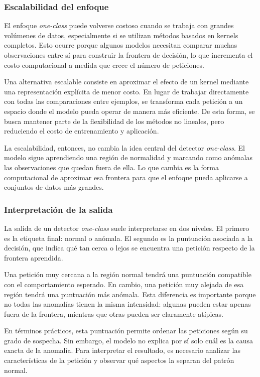 \documentclass[12pt,oneside]{report}
\begin{document}
\subsubsection{Escalabilidad del enfoque}

El enfoque \textit{one-class} puede volverse costoso cuando se trabaja con grandes volúmenes de datos, especialmente si se utilizan métodos basados en kernels completos. Esto ocurre porque algunos modelos necesitan comparar muchas observaciones entre sí para construir la frontera de decisión, lo que incrementa el costo computacional a medida que crece el número de peticiones.

Una alternativa escalable consiste en aproximar el efecto de un kernel mediante una representación explícita de menor costo. En lugar de trabajar directamente con todas las comparaciones entre ejemplos, se transforma cada petición a un espacio donde el modelo pueda operar de manera más eficiente. De esta forma, se busca mantener parte de la flexibilidad de los métodos no lineales, pero reduciendo el costo de entrenamiento y aplicación.

La escalabilidad, entonces, no cambia la idea central del detector \textit{one-class}. El modelo sigue aprendiendo una región de normalidad y marcando como anómalas las observaciones que quedan fuera de ella. Lo que cambia es la forma computacional de aproximar esa frontera para que el enfoque pueda aplicarse a conjuntos de datos más grandes.

\subsubsection{Interpretación de la salida}

La salida de un detector \textit{one-class} suele interpretarse en dos niveles. El primero es la etiqueta final: normal o anómala. El segundo es la puntuación asociada a la decisión, que indica qué tan cerca o lejos se encuentra una petición respecto de la frontera aprendida.

Una petición muy cercana a la región normal tendrá una puntuación compatible con el comportamiento esperado. En cambio, una petición muy alejada de esa región tendrá una puntuación más anómala. Esta diferencia es importante porque no todas las anomalías tienen la misma intensidad: algunas pueden estar apenas fuera de la frontera, mientras que otras pueden ser claramente atípicas.

En términos prácticos, esta puntuación permite ordenar las peticiones según su grado de sospecha. Sin embargo, el modelo no explica por sí solo cuál es la causa exacta de la anomalía. Para interpretar el resultado, es necesario analizar las características de la petición y observar qué aspectos la separan del patrón normal.
\end{document}
